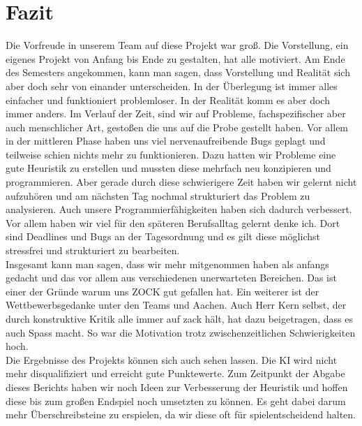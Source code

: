\documentclass[12pt,a4paper,bibliography=totocnumbered,listof=totocnumbered]{scrartcl}
\begin{document}
    \section{Fazit}
    \vspace{1em}
	Die Vorfreude in unserem Team auf diese Projekt war groß. Die Vorstellung, ein eigenes Projekt von Anfang bis Ende zu gestalten, hat alle motiviert. Am Ende des Semesters angekommen, kann man sagen, dass Vorstellung und Realität sich aber doch sehr von einander unterscheiden. In der Überlegung ist immer alles einfacher und funktioniert problemloser. In der Realität komm es aber doch immer anders. Im Verlauf der Zeit, sind wir auf Probleme, fachspezifischer aber auch menschlicher Art, gestoßen die uns auf die Probe gestellt haben. Vor allem in der mittleren Phase haben uns viel nervenaufreibende Bugs geplagt und teilweise schien nichts mehr zu funktionieren. Dazu hatten wir Probleme eine gute Heuristik zu erstellen und mussten diese mehrfach neu konzipieren und programmieren. Aber gerade durch diese schwierigere Zeit haben wir gelernt nicht aufzuhören und am nächsten Tag nochmal strukturiert das Problem zu analysieren. Auch unsere Programmierfähigkeiten haben sich dadurch verbessert. Vor allem haben wir viel für den späteren Berufsalltag gelernt denke ich. Dort sind Deadlines und Bugs an der Tagesordnung und es gilt diese möglichst stressfrei und strukturiert zu bearbeiten.\\
	Insgesamt kann man sagen, dass wir mehr mitgenommen haben als anfangs gedacht und das vor allem aus verschiedenen unerwarteten Bereichen. Das ist einer der Gründe warum uns \grqq ZOCK\glqq{} gut gefallen hat. Ein weiterer ist der Wettbewerbsgedanke unter den Teams und Aachen. Auch Herr Kern selbst, der durch konstruktive Kritik alle immer \glqq auf zack\grqq{} hält, hat dazu beigetragen, dass es auch Spass macht. So war die Motivation trotz zwischenzeitlichen Schwierigkeiten hoch.\\
	Die Ergebnisse des Projekts können sich auch sehen lassen. Die KI wird nicht mehr disqualifiziert und erreicht gute Punktewerte. Zum Zeitpunkt der Abgabe dieses Berichts haben wir noch Ideen zur Verbesserung der Heuristik und hoffen diese bis zum großen Endspiel noch umsetzten zu können. Es geht dabei darum mehr Überschreibsteine zu erspielen, da wir diese oft für spielentscheidend halten.\\
\end{document}
